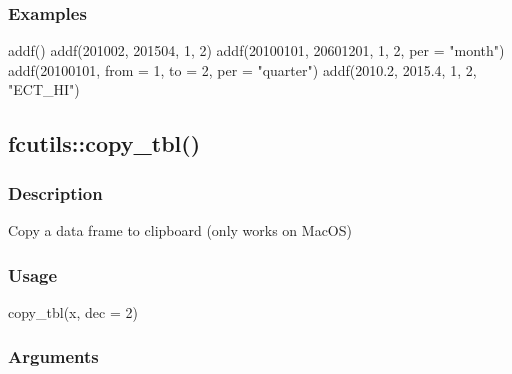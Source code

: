 \documentclass[
  letterpaper,
  DIV=11,
  numbers=noendperiod]{scrreport}
\newenvironment{Shaded}{\begin{snugshade}}{\end{snugshade}}
\newcommand{\AttributeTok}[1]{\textcolor[rgb]{0.40,0.45,0.13}{#1}}
\newcommand{\DecValTok}[1]{\textcolor[rgb]{0.68,0.00,0.00}{#1}}
\newcommand{\FloatTok}[1]{\textcolor[rgb]{0.68,0.00,0.00}{#1}}
\newcommand{\FunctionTok}[1]{\textcolor[rgb]{0.28,0.35,0.67}{#1}}
\newcommand{\NormalTok}[1]{\textcolor[rgb]{0.00,0.23,0.31}{#1}}
\newcommand{\StringTok}[1]{\textcolor[rgb]{0.13,0.47,0.30}{#1}}
\begin{document}
\subsubsection{Examples}\label{examples-4}

\begin{Shaded}
\begin{Highlighting}[]
\FunctionTok{addf}\NormalTok{()}
\FunctionTok{addf}\NormalTok{(}\DecValTok{201002}\NormalTok{, }\DecValTok{201504}\NormalTok{, }\DecValTok{1}\NormalTok{, }\DecValTok{2}\NormalTok{)}
\FunctionTok{addf}\NormalTok{(}\DecValTok{20100101}\NormalTok{, }\DecValTok{20601201}\NormalTok{, }\DecValTok{1}\NormalTok{, }\DecValTok{2}\NormalTok{, }\AttributeTok{per =} \StringTok{"month"}\NormalTok{)}
\FunctionTok{addf}\NormalTok{(}\DecValTok{20100101}\NormalTok{, }\AttributeTok{from =} \DecValTok{1}\NormalTok{, }\AttributeTok{to =} \DecValTok{2}\NormalTok{, }\AttributeTok{per =} \StringTok{"quarter"}\NormalTok{)}
\FunctionTok{addf}\NormalTok{(}\FloatTok{2010.2}\NormalTok{, }\FloatTok{2015.4}\NormalTok{, }\DecValTok{1}\NormalTok{, }\DecValTok{2}\NormalTok{, }\StringTok{"ECT\_HI"}\NormalTok{)}
\end{Highlighting}
\end{Shaded}

\subsection{fcutils::copy\_tbl()}\label{fcutilscopy_tbl}

\subsubsection{Description}\label{description-5}

Copy a data frame to clipboard (only works on MacOS)

\subsubsection{Usage}\label{usage-5}

\begin{Shaded}
\begin{Highlighting}[]
\FunctionTok{copy\_tbl}\NormalTok{(x, }\AttributeTok{dec =} \DecValTok{2}\NormalTok{)}
\end{Highlighting}
\end{Shaded}

\subsubsection{Arguments}\label{arguments-5}
\end{document}
